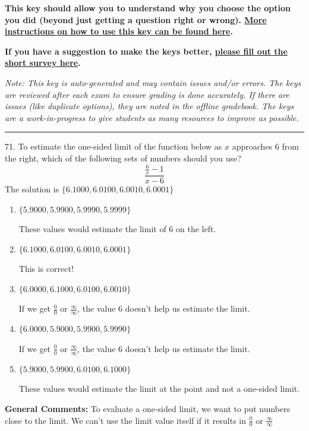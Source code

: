 \documentclass{extbook}[14pt]
\begin{document}
\textbf{This key should allow you to understand why you choose the option you did (beyond just getting a question right or wrong). \href{https://xronos.clas.ufl.edu/mac1105spring2020/courseDescriptionAndMisc/Exams/LearningFromResults}{More instructions on how to use this key can be found here}.}

\textbf{If you have a suggestion to make the keys better, \href{https://forms.gle/CZkbZmPbC9XALEE88}{please fill out the short survey here}.}

\textit{Note: This key is auto-generated and may contain issues and/or errors. The keys are reviewed after each exam to ensure grading is done accurately. If there are issues (like duplicate options), they are noted in the offline gradebook. The keys are a work-in-progress to give students as many resources to improve as possible.}

\rule{\textwidth}{0.4pt}

71. To estimate the one-sided limit of the function below as $x$ approaches 6 from the right, which of the following sets of numbers should you use?
\[ \frac{\frac{6}{x} - 1}{x - 6} \] 
The solution is $ \{ 6.1000, 6.0100, 6.0010, 6.0001 \} $ 

\begin{enumerate}[label=\Alph*.] 
\item $ \{ 5.9000, 5.9900, 5.9990, 5.9999 \} $ 

 These values would estimate the limit of 6 on the left. 
\item $ \{ 6.1000, 6.0100, 6.0010, 6.0001 \} $ 

 This is correct! 
\item $ \{ 6.0000, 6.1000, 6.0100, 6.0010 \} $ 

 If we get $\frac{0}{0}$ or $\frac{\infty}{\infty}$, the value 6 doesn't help us estimate the limit. 
\item $ \{ 6.0000, 5.9000, 5.9900, 5.9990 \} $ 

 If we get $\frac{0}{0}$ or $\frac{\infty}{\infty}$, the value 6 doesn't help us estimate the limit. 
\item $ \{ 5.9000, 5.9900, 6.0100, 6.1000 \} $ 

 These values would estimate the limit at the point and not a one-sided limit. 
\end{enumerate} 
 
\textbf{General Comments:} To evaluate a one-sided limit, we want to put numbers close to the limit. We can't use the limit value itself if it results in $\frac{0}{0}$ or $\frac{\infty}{\infty}$
\end{document}
